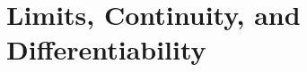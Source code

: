 \section{Limits, Continuity, and Differentiability} \label{S:1.7.LimContDiff}



\newpage



\newpage



\newpage



\newpage
